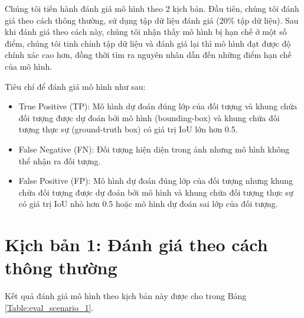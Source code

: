\documentclass[../thesis.tex]{subfiles}
\begin{document}

Chúng tôi tiến hành đánh giá mô hình theo 2 kịch bản. Đầu tiên, chúng tôi đánh giá theo cách thông thường, sử dụng tập dữ liệu đánh giá (20\% tập dữ liệu). Sau khi đánh giá theo cách này, chúng tôi nhận thấy mô hình bị hạn chế ở một số điểm, chúng tôi tinh chỉnh tập dữ liệu và đánh giá lại thì mô hình đạt được độ chính xác cao hơn, đồng thời tìm ra nguyên nhân dẫn đến những điểm hạn chế của mô hình. 

Tiêu chí để đánh giá mô hình như sau:

\begin{itemize}[topsep=0pt]
    \item True Positive (TP): Mô hình dự đoán đúng lớp của đối tượng và khung chứa đối tượng được dự đoán bởi mô hình (bounding-box) và khung chứa đối tượng thực sự (ground-truth box) có giá trị IoU lớn hơn 0.5.
    \item False Negative (FN): Đối tượng hiện diện trong ảnh nhưng mô hình không thể nhận ra đối tượng.
    \item False Positive (FP): Mô hình dự đoán đúng lớp của đối tượng nhưng khung chứa đối tượng được dự đoán bởi mô hình và khung chứa đối tượng thực sự có giá trị IoU nhỏ hơn 0.5 hoặc mô hình dự đoán sai lớp của đối tượng.
\end{itemize}

\section{Kịch bản 1: Đánh giá theo cách thông thường}

Kết quả đánh giá mô hình theo kịch bản này được cho trong Bảng \ref{Table:eval_scenario_1}.
\end{document}
